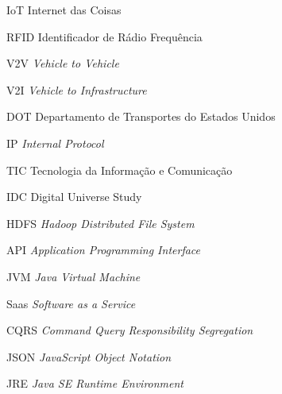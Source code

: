 \begin{siglas}
  \item[IoT] Internet das Coisas
  \item[RFID] Identificador de Rádio Frequência
  \item[V2V] \textit{Vehicle to Vehicle}
  \item[V2I] \textit{Vehicle to Infrastructure}
  \item[DOT] Departamento de Transportes do Estados Unidos
  \item[IP]  \textit{Internal Protocol}
  \item[TIC] Tecnologia da Informação e Comunicação
  \item[IDC] Digital Universe Study
  \item[HDFS] \textit{Hadoop Distributed File System}
  \item[API] \textit{Application Programming Interface}
  \item[JVM] \textit{Java Virtual Machine}
  \item[Saas] \textit{Software as a Service}
  \item[CQRS] \textit{Command Query Responsibility Segregation}
  \item[JSON] \textit{JavaScript Object Notation}
  \item[JRE] \textit{Java SE Runtime Environment}
\end{siglas}